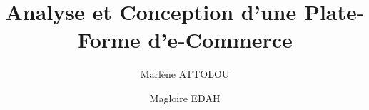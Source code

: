 \title{Analyse et Conception d'une Plate-Forme d'e-Commerce}
\author{Marlène ATTOLOU \and Magloire EDAH}